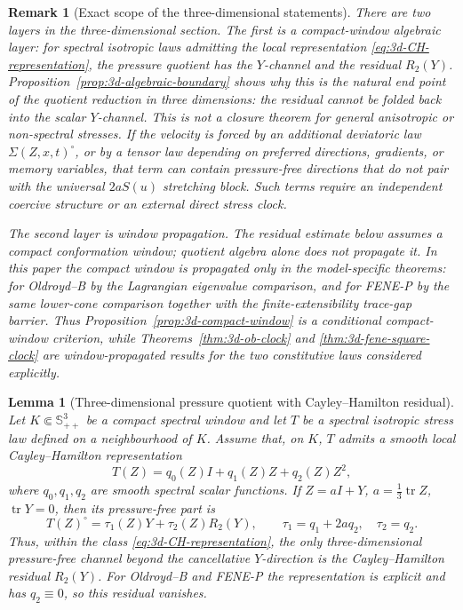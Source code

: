 \documentclass[11pt]{article}
\newtheorem{lemma}{Lemma}[section]
\newtheorem{remark}{Remark}[section]
\newcommand{\Spp}{\mathbb S_{++}}
\newcommand{\tr}{\operatorname{tr}}
\begin{document}
\begin{remark}[Exact scope of the three-dimensional statements]
\label{rem:3d-scope}
There are two layers in the three-dimensional section.  The first is a
compact-window algebraic layer: for spectral isotropic laws admitting the local
representation \eqref{eq:3d-CH-representation}, the pressure quotient has the
\(Y\)-channel and the residual \(R_2(Y)\).  Proposition~\ref{prop:3d-algebraic-boundary}
shows why this is the natural end point of the quotient reduction in three
dimensions: the residual cannot be folded back into the scalar \(Y\)-channel.
This is not a closure theorem for general anisotropic or non-spectral stresses.
If the velocity is forced by an additional deviatoric law
\(\Sigma(Z,x,t)^\circ\), or by a tensor law depending
on preferred directions, gradients, or memory variables, that term can contain
pressure-free directions that do not pair with the universal \(2aS(u)\)
stretching block.  Such terms require an independent coercive structure or an
external direct stress clock.

The second layer is window propagation.  The residual estimate below assumes a
compact conformation window; quotient algebra alone does not propagate it.  In
this paper the compact window is propagated only in the model-specific theorems:
for Oldroyd--B by the Lagrangian eigenvalue comparison, and for FENE-P by the
same lower-cone comparison together with the finite-extensibility trace-gap
barrier.  Thus Proposition~\ref{prop:3d-compact-window} is a conditional
compact-window criterion, while Theorems~\ref{thm:3d-ob-clock} and
\ref{thm:3d-fene-square-clock} are window-propagated results for the two
constitutive laws considered explicitly.
\end{remark}

\begin{lemma}[Three-dimensional pressure quotient with Cayley--Hamilton residual]
\label{lem:3d-pressure-residual}
Let \(K\Subset\Spp^3\) be a compact spectral window and let \(T\) be a
spectral isotropic stress law defined on a neighbourhood of \(K\).  Assume that,
on \(K\), \(T\) admits a smooth local Cayley--Hamilton representation
\begin{equation}
  T(Z)=q_0(Z)I+q_1(Z)Z+q_2(Z)Z^2,
  \label{eq:3d-CH-representation}
\end{equation}
where \(q_0,q_1,q_2\) are smooth spectral scalar functions.  If
\(Z=aI+Y\), \(a=\frac13\tr Z\), \(\tr Y=0\), then its pressure-free part is
\begin{equation}
  T(Z)^\circ=\tau_1(Z)Y+\tau_2(Z)R_2(Y),\qquad
  \tau_1=q_1+2aq_2,
  \quad \tau_2=q_2 .
  \label{eq:3d-pressure-residual-split}
\end{equation}
Thus, within the class \eqref{eq:3d-CH-representation}, the only
three-dimensional pressure-free channel beyond the cancellative \(Y\)-direction
is the Cayley--Hamilton residual \(R_2(Y)\).  For Oldroyd--B and FENE-P the representation is explicit and has \(q_2\equiv0\), so this residual vanishes.
\end{lemma}
\end{document}
